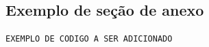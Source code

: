 \documentclass[
	12pt,				%
	openright,			%
	oneside,			%
	a4paper,			%
	english,			%
	brazil				%
	]{abntex2}
\begin{document}
\begin{apendicesenv}

\partapendices

\chapter{\label{AnexoA}Exemplo de seção de anexo}

\begin{lstlisting}
EXEMPLO DE CODIGO A SER ADICIONADO
\end{lstlisting}

\end{apendicesenv}
\end{document}
